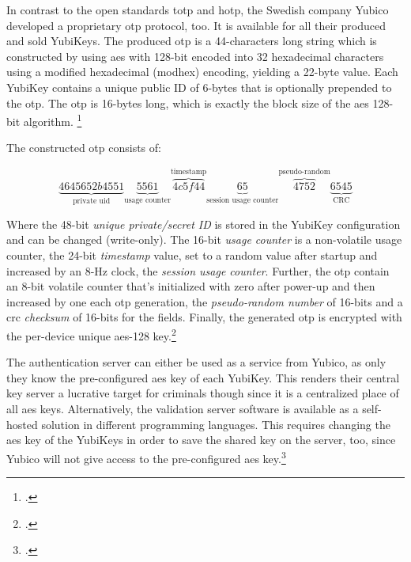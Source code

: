 In contrast to the open standards \gls{totp} and \gls{hotp}, the Swedish company Yubico developed a proprietary \gls{otp} protocol, too. It is available for all their produced and sold YubiKeys. The produced \gls{otp} is a 44-characters long string which is constructed by using \gls{aes} with 128-bit encoded into 32 hexadecimal characters using a modified hexadecimal (\frqq modhex\flqq) encoding, yielding a 22-byte value. Each YubiKey contains a unique public ID of 6-bytes that is optionally prepended to the \gls{otp}. The \gls{otp} is 16-bytes long, which is exactly the block size of the \gls{aes} 128-bit algorithm. \footcites[][]{10.1007/978-3-642-38004-4_17}[See][84--86]{Jacobs:2016:STA:2953926.2953927}

The constructed \gls{otp} consists of:

\begin{equation*}
	\underbrace{4645652b4551}_\text{private uid}\underbrace{5561}_\text{usage counter}\overbrace{4c5f44}^\text{timestamp}\underbrace{65}_\text{session usage counter}\overbrace{4752}^\text{pseudo-random}\underbrace{6545}_\text{CRC}
\end{equation*}

Where the 48-bit \textit{unique private/secret ID} is stored in the YubiKey configuration and can be changed (write-only). The 16-bit \textit{usage counter} is a non-volatile usage counter, the 24-bit \textit{timestamp} value, set to a random value after startup and increased by an 8-Hz clock, the \textit{session usage counter}. Further, the \gls{otp} contain an 8-bit volatile counter that's initialized with zero after power-up and then increased by one each \gls{otp} generation, the \textit{pseudo-random number} of 16-bits and a \gls{crc} \textit{checksum} of 16-bits for the fields. Finally, the generated \gls{otp} is encrypted with the per-device unique \gls{aes}-128 key.\footcites[See][8--9, 33--34]{yubico-otp}[See][209--210]{10.1007/978-3-642-41284-4_11}

The authentication server can either be used as a service from Yubico, as only they know the pre-configured \gls{aes} key of each YubiKey. This renders their central key server a lucrative target for criminals though since it is a centralized place of all \gls{aes} keys. Alternatively, the validation server software is available as a self-hosted solution in different programming languages. This requires changing the \gls{aes} key of the YubiKeys in order to save the shared key on the server, too, since Yubico will not give access to the pre-configured \gls{aes} key.\footcites[See][8--9]{yubico-cloud}